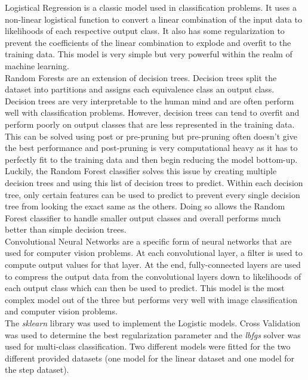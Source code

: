 \documentclass[conference]{IEEEtran}
\begin{document}
Logistical Regression is a classic model used in classification problems. It uses a non-linear logistical function to convert a linear combination of the input data to likelihoods of each respective output class. It also has some regularization to prevent the coefficients of the linear combination to explode and overfit to the training data. This model is very simple but very powerful within the realm of machine learning. \\

Random Forests are an extension of decision trees. Decision trees split the dataset into partitions and assigns each equivalence class an output class. Decision trees are very interpretable to the human mind and are often perform well with classification problems. However, decision trees can tend to overfit and perform poorly on output classes that are less represented in the training data. This can be solved using post or pre-pruning but pre-pruning often doesn't give the best performance and post-pruning is very computational heavy as it has to perfectly fit to the training data and then begin reducing the model bottom-up. Luckily, the Random Forest classifier solves this issue by creating multiple decision trees and using this list of decision trees to predict. Within each decision tree, only certain features can be used to predict to prevent every single decision tree from looking the exact same as the others. Doing so allows the Random Forest classifier to handle smaller output classes and overall performs much better than simple decision trees. \\

Convolutional Neural Networks are a specific form of neural networks that are used for computer vision problems. At each convolutional layer, a filter is used to compute output values for that layer. At the end, fully-connected layers are used to compress the output data from the convolutional layers down to likelihoods of each output class which can then be used to predict. This model is the most complex model out of the three but performs very well with image classification and computer vision problems. \\

The \emph{sklearn} library was used to implement the Logistic models. Cross Validation was used to determine the best regularization parameter and the \emph{lbfgs} solver was used for multi-class classification. Two different models were fitted for the two different provided datasets (one model for the linear dataset and one model for the step dataset). \\
\end{document}
